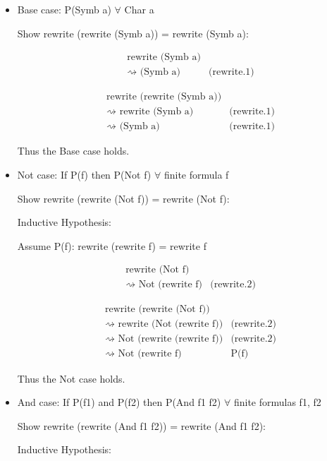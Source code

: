\documentclass{article}
\begin{document}
\begin{itemize}

\item Base case: P(Symb a) $\forall$ Char a

Show rewrite (rewrite (Symb a)) = rewrite (Symb a):

\begin{align*}
&\text{rewrite (Symb a)} \\
&\rightsquigarrow \text{ (Symb a)}		&\text{(rewrite.1)}
\end{align*}

\begin{align*}
&\text{rewrite (rewrite (Symb a))} \\
&\rightsquigarrow \text{  rewrite (Symb a)}		&\text{(rewrite.1)} \\
&\rightsquigarrow \text{ (Symb a)}				&\text{(rewrite.1)}
\end{align*}

Thus the Base case holds.

\item Not case: If P(f) then P(Not f) $\forall$ finite formula f

Show rewrite (rewrite (Not f)) = rewrite (Not f):

Inductive Hypothesis:

Assume P(f): rewrite (rewrite f) = rewrite f

\begin{align*}
&\text{rewrite (Not f)} \\
&\rightsquigarrow \text{ Not (rewrite f)}		&\text{(rewrite.2)}
\end{align*}

\begin{align*}
&\text{rewrite (rewrite (Not f))} \\
&\rightsquigarrow \text{ rewrite (Not (rewrite f))}		&\text{(rewrite.2)} \\
&\rightsquigarrow \text{ Not (rewrite (rewrite f))}		&\text{(rewrite.2)} \\
&\rightsquigarrow \text{ Not (rewrite f)}				&\text{P(f)}
\end{align*}

Thus the Not case holds.

\item And case: If P(f1) and P(f2) then P(And f1 f2) $\forall$ finite formulas
f1, f2

Show rewrite (rewrite (And f1 f2)) = rewrite (And f1 f2):

Inductive Hypothesis:


\end{itemize}
\end{document}

